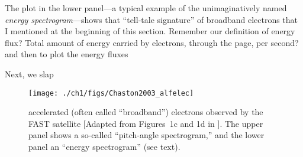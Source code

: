The plot in the lower panel---a typical example of the unimaginatively
named \emph{energy spectrogram}---shows that ``tell-tale signature''
of broadband electrons that I mentioned at the beginning of this
section. Remember our definition of energy flux? Total amount of
energy carried by electrons, through the page, per second?  and
then to plot the energy fluxes

Next, we slap 


  \begin{figure}
    \centering
    \noindent\texttt{[image: ./ch1/figs/Chaston2003\_alfelec]}
    \caption[\Alfically accelerated (broadband) electrons]{\Alfically
      accelerated (often called ``broadband'') electrons observed by
      the FAST satellite [Adapted from Figures~1c and 1d in
      \citealp{Chaston2003a}]. The upper panel shows a so-called
      ``pitch-angle spectrogram,'' and the lower panel an ``energy
      spectrogram'' (see text).}
    \label{ch1:FigAlfElec}
  \end{figure}


  

\setlength\parindent{\savedparindent}
\setlength\parskip{\savedparskip}



